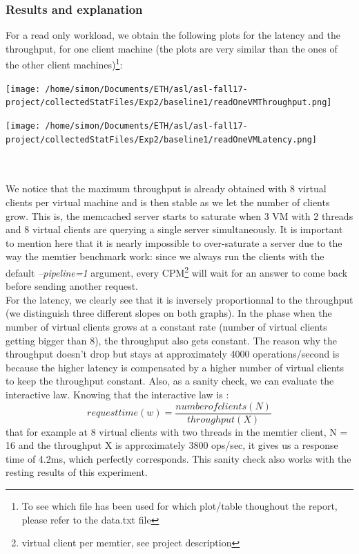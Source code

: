 \documentclass[11pt,a4paper]{article}
\begin{document}
\subsubsection{Results and explanation}
For a read only workload, we obtain the following plots for the latency and the throughput, for one client machine (the plots are very similar than the ones of the other client machines)\footnote{To see which file has been used for which plot/table thoughout the report, please refer to the data.txt file}:
\\
\begin{minipage}{0.5\linewidth}
\texttt{[image: /home/simon/Documents/ETH/asl/asl-fall17-project/collectedStatFiles/Exp2/baseline1/readOneVMThroughput.png]}
\end{minipage}
\hfill
\begin{minipage}{0.5\linewidth}
\texttt{[image: /home/simon/Documents/ETH/asl/asl-fall17-project/collectedStatFiles/Exp2/baseline1/readOneVMLatency.png]}
\end{minipage}
\\\\
We notice that the maximum throughput is already obtained with 8 virtual clients per virtual machine and is then stable as we let the number of clients grow. This is, the memcached server starts to saturate when 3 VM with 2 threads and 8 virtual clients are querying a single server simultaneously. It is important to mention here that it is nearly impossible to over-saturate a server due to the way the memtier benchmark work: since we always run the clients with the default \textit{--pipeline=1} argument, every CPM\footnote{virtual client per memtier, see project description} will wait for an answer to come back before sending another request.
\\
For the latency, we clearly see that it is inversely proportionnal to the throughput (we distinguish three different slopes on both graphs). In the phase when the number of virtual clients grows at a constant rate (number of virtual clients getting bigger than 8), the throughput also gets constant. The reason why the throughput doesn't drop but stays at approximately 4000 operations/second is because the higher latency is compensated by a higher number of virtual clients to keep the throughput constant. Also, as a sanity check, we can evaluate the interactive law. Knowing that the interactive law is : \[ request time (w) = \frac{number of clients (N)}{throughput (X)}\] that for example at 8 virtual clients with two threads in the memtier client, N = 16 and the throughput X is approximately 3800 ops/sec, it gives us a response time of 4.2ms, which perfectly corresponds. This sanity check also works with the resting results of this experiment. 
\end{document}
